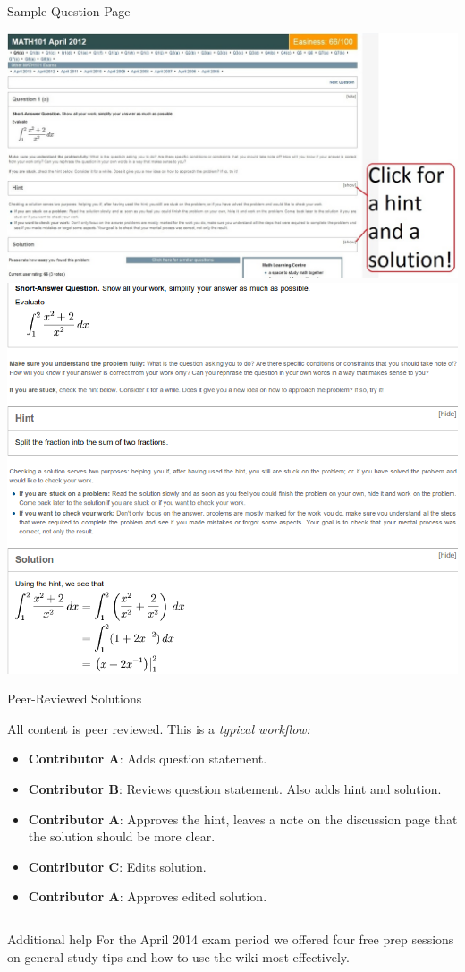 \documentclass[final]{beamer}
\newlength{\onecolwid}
\begin{document}
\begin{frame}[t]
\begin{columns}[t]
\begin{column}{\onecolwid}
\begin{block}{Sample Question Page}
\begin{center}
\hfill
\includegraphics[width=.5\textwidth]{QuestionPage5.jpg} \hfill
\includegraphics[width=.3\textwidth]{QuestionPage5_open.png} \hfill \mbox{}
\end{center}
\end{block}



\begin{block}{Peer-Reviewed Solutions}

All content is peer reviewed. This is a \emph{typical workflow:}

\medskip

\begin{itemize}
\item \textbf{Contributor A}: Adds question statement.
\item \textbf{Contributor B}: Reviews question statement. Also adds hint and solution.
\item \textbf{Contributor A}: Approves the hint, leaves a note on the discussion page that the solution should be more clear.
\item \textbf{Contributor C}: Edits solution.
\item \textbf{Contributor A}: Approves edited solution.
\end{itemize}

\end{block}


\vspace{-2cm}

\begin{center}
\begin{columns}[t]
\hfill
\begin{column}{.45\textwidth}
\begin{block}{Additional help}
For the April 2014 exam period we offered four free prep sessions on general study tips and how to use the wiki most effectively.


\end{block}
\end{column}
\end{columns}
\end{center}
\end{column}
\end{columns}
\end{frame}
\end{document}
